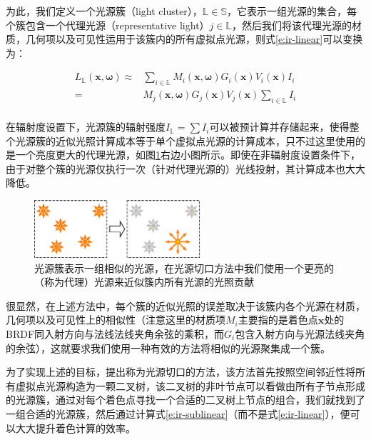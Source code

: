 为此，我们定义一个光源簇（light cluster），$\mathds{L}\in\mathds{S}$，它表示一组光源的集合，每个簇包含一个代理光源（representative light）$j\in\mathds{L}$，然后我们将该代理光源的材质，几何项以及可见性运用于该簇内的所有虚拟点光源，则式\ref{e:ir-linear}可以变换为：

\begin{equation}\label{e:ir-sublinear}
\begin{aligned}
	L_{\mathds{L}}(\mathbf{x},\mathbf{\omega}) \approx & \sum_{i\in\mathds{L}}M_i(\mathbf{x},\mathbf{\omega})G_i(\mathbf{x})V_i(\mathbf{x})I_i\\
	= & M_j(\mathbf{x},\mathbf{\omega})G_j(\mathbf{x})V_j(\mathbf{x})\sum_{i\in\mathds{L}}I_i\\
\end{aligned}
\end{equation}

在辐射度设置下，光源簇的辐射强度$I_{\mathds{L}}=\sum I_i$可以被预计算并存储起来，使得整个光源簇的近似光照计算成本等于单个虚拟点光源的计算成本，只不过这里使用的是一个亮度更大的代理光源，如图\ref{f:ir-light-cluster}右边小图所示。即使在非辐射度设置条件下，由于对整个簇的光源仅执行一次（针对代理光源的）光线投射，其计算成本也大大降低。

\begin{figure}
	\sidecaption
	\includegraphics[width=0.55\textwidth]{figures/ir/light-cluster}
	\caption{光源簇表示一组相似的光源，在光源切口方法中我们使用一个更亮的（称为代理）光源来近似簇内所有光源的光照贡献}
	\label{f:ir-light-cluster}
\end{figure}

很显然，在上述方法中，每个簇的近似光照的误差取决于该簇内各个光源在材质，几何项以及可见性上的相似性（注意这里的材质项$M_i$主要指的是着色点$\mathbf{x}$处的BRDF同入射方向与法线法线夹角余弦的乘积，而$G_i$包含入射方向与光源法线夹角的余弦），这就要求我们使用一种有效的方法将相似的光源聚集成一个簇。

为了实现上述的目标，\cite{a:Lightcuts:AScalableApproachtoIllumination}提出称为光源切口的方法，该方法首先按照空间邻近性将所有虚拟点光源构造为一颗二叉树，该二叉树的非叶节点可以看做由所有子节点形成的光源簇，通过对每个着色点寻找一个合适的二叉树上节点的组合，我们就找到了一组合适的光源簇，然后通过计算式\ref{e:ir-sublinear}（而不是式\ref{e:ir-linear}），便可以大大提升着色计算的效率。




